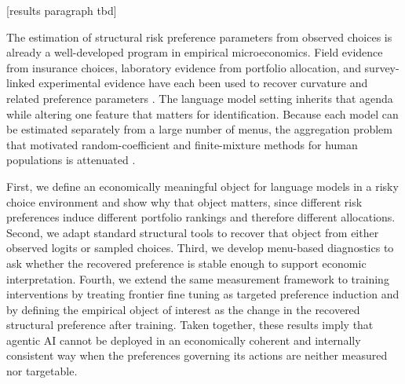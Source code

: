 [results paragraph tbd]


The estimation of structural risk preference parameters from observed choices is already a well-developed program in empirical microeconomics. Field evidence from insurance choices, laboratory evidence from portfolio allocation, and survey-linked experimental evidence have each been used to recover curvature and related preference parameters \citep{cohen2007estimating, choi2007consistency, tanaka2010risk, barseghyan2018estimating}. The language model setting inherits that agenda while altering one feature that matters for identification. Because each model can be estimated separately from a large number of menus, the aggregation problem that motivated random-coefficient and finite-mixture methods for human populations is attenuated \citep{vongaudecker2011heterogeneity, bruhin2010risk}.

First, we define an economically meaningful object for language models in a risky choice environment and show why that object matters, since different risk preferences induce different portfolio rankings and therefore different allocations. Second, we adapt standard structural tools to recover that object from either observed logits or sampled choices. Third, we develop menu-based diagnostics to ask whether the recovered preference is stable enough to support economic interpretation. Fourth, we extend the same measurement framework to training interventions by treating frontier fine tuning as targeted preference induction and by defining the empirical object of interest as the change in the recovered structural preference after training. Taken together, these results imply that agentic AI cannot be deployed in an economically coherent and internally consistent way when the preferences governing its actions are neither measured nor targetable.

